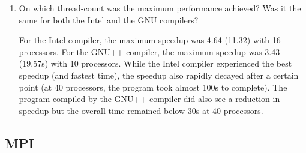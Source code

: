 \documentclass{article}
\begin{document}
\begin{enumerate}
	\item On which thread-count was the maximum performance achieved? Was it the same for both the Intel and the GNU compilers?

	For the Intel compiler, the maximum speedup was 4.64 (11.32) with 16 processors. For the GNU++ compiler, the maximum speedup was 3.43 (19.57s) with 10 processors. While the Intel compiler experienced the best speedup (and fastest time), the speedup also rapidly decayed after a certain point (at 40 processors, the program took almost 100s to complete). The program compiled by the GNU++ compiler did also see a reduction in speedup but the overall time remained below 30s at 40 processors.

\end{enumerate}

\subsection{MPI}
\end{document}
